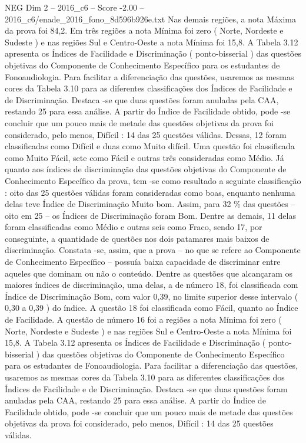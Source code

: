 \begin{textsample}{NEG Dim 2 – 2016\_c6 – Score -2.00 – 2016\_c6/enade\_2016\_fono\_8d596b926e.txt}
Nas demais regiões, a nota Máxima da prova foi 84,2.
Em três regiões a nota Mínima foi zero ( Norte, Nordeste e Sudeste ) e nas regiões Sul e Centro-Oeste a nota Mínima foi 15,8.
A Tabela 3.12 apresenta os Índices de Facilidade e Discriminação ( ponto-bisserial ) das questões objetivas do Componente de Conhecimento Específico para os estudantes de Fonoaudiologia.
Para facilitar a diferenciação das questões, usaremos as mesmas cores da Tabela 3.10 para as diferentes classificações dos Índices de Facilidade e de Discriminação.
Destaca -se que duas questões foram anuladas pela CAA, restando 25 para essa análise.
A partir do Índice de Facilidade obtido, pode -se concluir que um pouco mais de metade das questões objetivas da prova foi considerado, pelo menos, Difícil : 14 das 25 questões válidas.
Dessas, 12 foram classificadas como Difícil e duas como Muito difícil.
Uma questão foi classificada como Muito Fácil, sete como Fácil e outras três consideradas como Médio.
Já quanto aos índices de discriminação das questões objetivas do Componente de Conhecimento Específico da prova, tem -se como resultado a seguinte classificação : oito das 25 questões válidas foram consideradas como boas, enquanto nenhuma delas teve Índice de Discriminação Muito bom.
Assim, para 32 \% das questões – oito em 25 – os Índices de Discriminação foram Bom.
Dentre as demais, 11 delas foram classificadas como Médio e outras seis como Fraco, sendo 17, por conseguinte, a quantidade de questões nos dois patamares mais baixos de discriminação.
Constata -se, assim, que a prova – no que se refere ao Componente de Conhecimento Específico – possuía baixa capacidade de discriminar entre aqueles que dominam ou não o conteúdo.
Dentre as questões que alcançaram os maiores índices de discriminação, uma delas, a de número 18, foi classificada com Índice de Discriminação Bom, com valor 0,39, no limite superior desse intervalo ( 0,30 a 0,39 ) do índice.
A questão 18 foi classificada como Fácil, quanto ao Índice de Facilidade.
A questão de número 16 foi a regiões a nota Mínima foi zero ( Norte, Nordeste e Sudeste ) e nas regiões Sul e Centro-Oeste a nota Mínima foi 15,8.
A Tabela 3.12 apresenta os Índices de Facilidade e Discriminação ( ponto-bisserial ) das questões objetivas do Componente de Conhecimento Específico para os estudantes de Fonoaudiologia.
Para facilitar a diferenciação das questões, usaremos as mesmas cores da Tabela 3.10 para as diferentes classificações dos Índices de Facilidade e de Discriminação.
Destaca -se que duas questões foram anuladas pela CAA, restando 25 para essa análise.
A partir do Índice de Facilidade obtido, pode -se concluir que um pouco mais de metade das questões objetivas da prova foi considerado, pelo menos, Difícil : 14 das 25 questões válidas.

\end{textsample}
